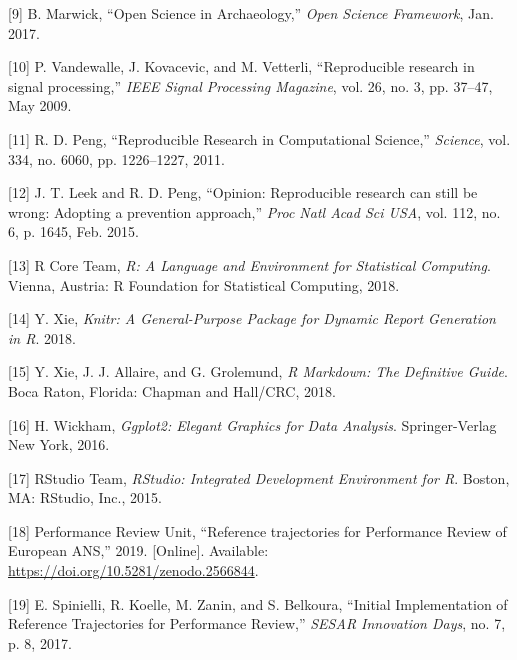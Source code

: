 \documentclass[conference,final,a4paper,]{IEEEtran}
\begin{document}
\leavevmode\hypertarget{ref-marwick_2017}{}%
{[}9{]} B. Marwick, ``Open Science in Archaeology,'' \emph{Open Science Framework}, Jan. 2017.

\leavevmode\hypertarget{ref-vandewalle_2009}{}%
{[}10{]} P. Vandewalle, J. Kovacevic, and M. Vetterli, ``Reproducible research in signal processing,'' \emph{IEEE Signal Processing Magazine}, vol. 26, no. 3, pp. 37--47, May 2009.

\leavevmode\hypertarget{ref-Peng1226}{}%
{[}11{]} R. D. Peng, ``Reproducible Research in Computational Science,'' \emph{Science}, vol. 334, no. 6060, pp. 1226--1227, 2011.

\leavevmode\hypertarget{ref-leek_2015}{}%
{[}12{]} J. T. Leek and R. D. Peng, ``Opinion: Reproducible research can still be wrong: Adopting a prevention approach,'' \emph{Proc Natl Acad Sci USA}, vol. 112, no. 6, p. 1645, Feb. 2015.

\leavevmode\hypertarget{ref-rcoreteam_2018}{}%
{[}13{]} R Core Team, \emph{R: A Language and Environment for Statistical Computing}. Vienna, Austria: R Foundation for Statistical Computing, 2018.

\leavevmode\hypertarget{ref-R-knitr}{}%
{[}14{]} Y. Xie, \emph{Knitr: A General-Purpose Package for Dynamic Report Generation in R}. 2018.

\leavevmode\hypertarget{ref-xie2018}{}%
{[}15{]} Y. Xie, J. J. Allaire, and G. Grolemund, \emph{R Markdown: The Definitive Guide}. Boca Raton, Florida: Chapman and Hall/CRC, 2018.

\leavevmode\hypertarget{ref-wickham_2016}{}%
{[}16{]} H. Wickham, \emph{Ggplot2: Elegant Graphics for Data Analysis}. Springer-Verlag New York, 2016.

\leavevmode\hypertarget{ref-rstudioteam_2015}{}%
{[}17{]} RStudio Team, \emph{RStudio: Integrated Development Environment for R}. Boston, MA: RStudio, Inc., 2015.

\leavevmode\hypertarget{ref-performancereviewunit_2019}{}%
{[}18{]} Performance Review Unit, ``Reference trajectories for Performance Review of European ANS,'' 2019. {[}Online{]}. Available: \url{https://doi.org/10.5281/zenodo.2566844}.

\leavevmode\hypertarget{ref-spinielli_2017}{}%
{[}19{]} E. Spinielli, R. Koelle, M. Zanin, and S. Belkoura, ``Initial Implementation of Reference Trajectories for Performance Review,'' \emph{SESAR Innovation Days}, no. 7, p. 8, 2017.

\endgroup
\end{document}
